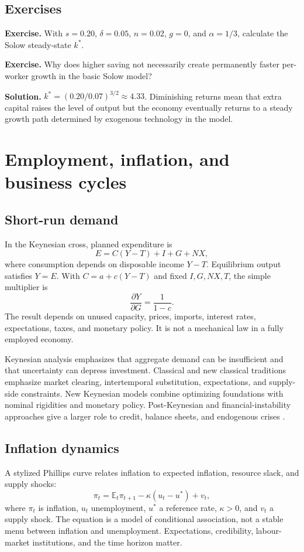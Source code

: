 \documentclass[11pt,oneside,openany]{book}
\newcommand{\E}{\mathbb{E}}
\newcommand{\exercise}[1]{\textbf{Exercise.} #1}
\newcommand{\solution}[1]{\textbf{Solution.} #1}
\begin{document}
\section{Exercises}

\exercise{With $s=0.20$, $\delta=0.05$, $n=0.02$, $g=0$, and $\alpha=1/3$, calculate the Solow steady-state $k^*$.}

\exercise{Why does higher saving not necessarily create permanently faster per-worker growth in the basic Solow model?}

\solution{$k^*=(0.20/0.07)^{3/2}\approx4.33$. Diminishing returns mean that extra capital raises the level of output but the economy eventually returns to a steady growth path determined by exogenous technology in the model.}

\chapter{Employment, inflation, and business cycles}
\label{ch:cycles}

\section{Short-run demand}

In the Keynesian cross, planned expenditure is \cite{keynes1936}
\[
  E=C(Y-T)+I+G+NX,
\]
where consumption depends on disposable income $Y-T$. Equilibrium output satisfies $Y=E$. With $C=a+c(Y-T)$ and fixed $I,G,NX,T$, the simple multiplier is
\[
  \frac{\partial Y}{\partial G}=\frac{1}{1-c}.
\]
The result depends on unused capacity, prices, imports, interest rates, expectations, taxes, and monetary policy. It is not a mechanical law in a fully employed economy.

Keynesian analysis emphasizes that aggregate demand can be insufficient and that uncertainty can depress investment. Classical and new classical traditions emphasize market clearing, intertemporal substitution, expectations, and supply-side constraints. New Keynesian models combine optimizing foundations with nominal rigidities and monetary policy. Post-Keynesian and financial-instability approaches give a larger role to credit, balance sheets, and endogenous crises \cite{minsky1986}.

\section{Inflation dynamics}

A stylized Phillips curve relates inflation to expected inflation, resource slack, and supply shocks:
\[
  \pi_t=\E_t\pi_{t+1}-\kappa(u_t-u^*)+v_t,
\]
where $\pi_t$ is inflation, $u_t$ unemployment, $u^*$ a reference rate, $\kappa>0$, and $v_t$ a supply shock. The equation is a model of conditional association, not a stable menu between inflation and unemployment. Expectations, credibility, labour-market institutions, and the time horizon matter.
\end{document}
